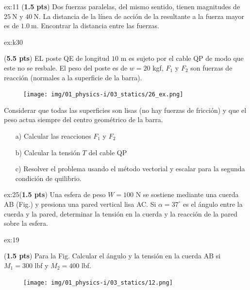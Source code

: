 \begin{multicols}{2}
    \begin{excercise}[][][$d=2.6\,\mathrm{m}$]{ex:11}{ (\textbf{1.5 pts})  
    Dos fuerzas paralelas, del mismo sentido, tienen magnitudes de $25\ \mathrm{N}$ y $40\ \mathrm{N}$.  
    La distancia de la línea de acción de la resultante a la fuerza mayor es de $1.0\ \mathrm{m}$.  
    Encontrar la distancia entre las fuerzas.  
    }
    \end{excercise}

    \begin{excercise}[][][a) $F_1= 2.32\, \mathrm{kgf}  , F_2=25\, \mathrm{kgf}$; b)  $T=17.7\ \mathrm{kgf}$]{ex:k30}{(\textbf{5.5 pts})
        EL poste QE de longitud $10$ m es sujeto por el cable QP de modo que este no se resbale. El peso del poste es de $w=20$ kgf, $F_1$ y $F_2$ son fuerzas de reacción (normales a la superficie de la barra). 
        \begin{figure}[H]
             \centering
             \texttt{[image: img/01\_physics-i/03\_statics/26\_ex.png]}
         \end{figure} 
         Considerar que todas las superficies son lisas (no hay fuerzas de fricción) y que el peso actua siempre del centro geométrico de la barra. 
        \begin{itemize}
             \item[a)] Calcular las reacciones $F_1$ y $F_2$ 
             \item[b)] Calcular la tensión $T$ del cable QP
             \item[c)] Resolver el problema usando el método vectorial y escalar para la segunda condición de quilibrio.
         \end{itemize} 
         }
    \end{excercise}
    \begin{excercise}{ex:25}{(\textbf{1.5 pts})
        Una esfera de peso $W=100$ N se sostiene mediante una cuerda AB (Fig.) y presiona una pared vertical lisa AC. Si $\alpha=37^\circ$ es el ángulo entre la cuerda y la pared, determinar la tensión en la cuerda y la reacción de la pared sobre la esfera.  
        } 
     \end{excercise}

     \begin{excercise}[][][$\theta=53^\circ $, $T=500\ \mathrm{lbf}$]{ex:19}{(\textbf{1.5 pts})
        Para la Fig. Calcular el ángulo y la tensión en la cuerda AB si $M_1=300$ lbf y $M_2=400$ lbf.     
         \begin{figure}[H]
             \centering
             \texttt{[image: img/01\_physics-i/03\_statics/12.png]}
         \end{figure}
    } 
     \end{excercise}

\end{multicols}
